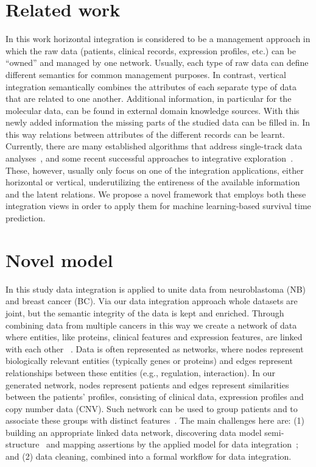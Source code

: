 \documentclass{bmcart}
\begin{document}
\section{Related work}

In this work horizontal integration is considered to be a management
approach in which the raw data (patients, clinical records, expression
profiles, etc.) can be {\textquotedblleft}owned{\textquotedblright} and
managed by one network. Usually, each type of raw data can define
different semantics for common management purposes. In contrast,
vertical integration semantically combines the attributes of each
separate type of data that are related to one another. Additional
information, in particular for the molecular data, can be found in
external domain knowledge sources. With this newly added information
the missing parts of the studied data can be filled in. In this way
relations between attributes of the different records can be learnt.
Currently, there are many established algorithms that address
single-track data analyses~\cite{25, 26, 30, 33}, and some recent successful
approaches to integrative exploration~\cite{31}. These, however, usually
only focus on one of the integration applications, either horizontal or
vertical, underutilizing the entireness of the available information
and the latent relations. We propose a novel framework that employs
both these integration views in order to apply them for machine
learning-based survival time prediction. 

\section{Novel model}

In this study data integration is applied to unite data from
neuroblastoma (NB) and breast cancer (BC). Via our data integration
approach whole datasets are joint, but the semantic integrity of the
data is kept and enriched. Through combining data from multiple cancers
in this way we create a network of data where entities, like proteins,
clinical features and expression features, are linked with each other~\cite{9}
. Data is often represented as networks, where nodes represent
biologically relevant entities (typically genes or proteins) and edges
represent relationships between these entities (e.g., regulation,
interaction). In our generated network, nodes represent patients and
edges represent similarities between the patients{\textquoteright}
profiles, consisting of clinical data, expression profiles and copy
number data (CNV). Such network can be used to group patients and to
associate these groups with distinct features~\cite{4}. The main challenges
here are: (1) building an appropriate linked data network, discovering
data model semi-structure~\cite{5} and mapping assertions by the applied
model for data integration~\cite{6}; and (2) data cleaning, combined into a
formal workflow for data integration. 
\end{document}

